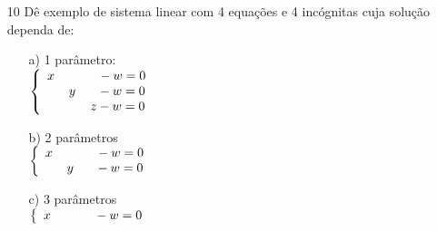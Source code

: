 \documentclass[a4paper]{article}
\begin{document}
\begin{itemize}
\item[10] Dê exemplo de sistema linear com 4 equações e 4 incógnitas cuja solução dependa de:
\begin{enumerate}
\item[a)] 1 parâmetro:
\\
\textcolor[rgb]{0,0,1}{$ \left\{
\begin{array}{lll}
\displaystyle x \hspace{12mm} - w = 0 \\
\displaystyle \hspace{6mm} y \hspace{6mm} - w = 0 \\
\displaystyle \hspace{12mm} z - w = 0
\end{array}
\right.
$}
\item[b)] 2 parâmetros
\\
\textcolor[rgb]{0,0,1}{$ \left\{
\begin{array}{ll}
\displaystyle x \hspace{12mm} - w = 0 \\
\displaystyle \hspace{6mm} y \hspace{6mm} - w = 0
\end{array}
\right.
$}
\item[c)] 3 parâmetros
\\
\textcolor[rgb]{0,0,1}{$ \left\{
\begin{array}{l}
\displaystyle x \hspace{12mm} - w = 0
\end{array}
\right.
$}
\end{enumerate}

\end{itemize}
\end{document}
